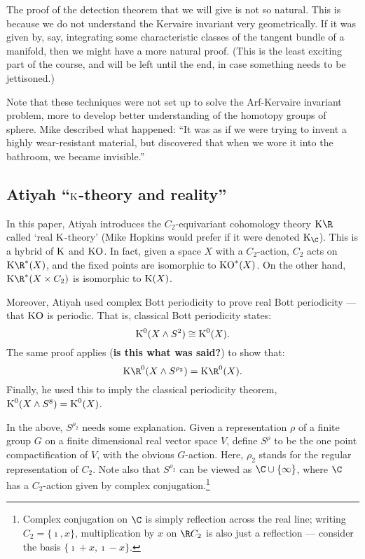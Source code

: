 \documentclass[11pt]{article}
\begin{document}
The proof of the detection theorem that we will give is not so natural. This is
because we do not understand the Kervaire invariant very geometrically. If it
was given by, say, integrating some characteristic classes of the tangent bundle
of a manifold, then we might have a more natural proof. {\small(This is the
least exciting part of the course, and will be left until the end, in case
something needs to be jettisoned.)}

Note that these techniques were not set up to solve the Arf-Kervaire invariant
problem, more to develop better understanding of the homotopy groups of sphere.
Mike described what happened: ``It was as if we were trying to invent a highly
wear-resistant material, but discovered that when we wore it into the bathroom,
we became invisible.''

\subsection*{Atiyah ``\texorpdfstring{$\operatorname{{K}}$}{K}-theory and reality''}
In this paper, Atiyah introduces the $C_2$-equivariant cohomology theory $\KR$
called `real $\operatorname{{K}}$-theory' (Mike Hopkins would prefer if it were denoted
${\K_\C}$). This is a hybrid of $\operatorname{{K}}$ and $\operatorname{{KO}}$. In fact, given a space $X$ with
a $C_2$-action, $C_2$ acts on $\KR^*(X)$, and the fixed points are isomorphic to
$\operatorname{{KO}}^*(X)$. On the other hand, $\KR^*(X\times C_2)$ is isomorphic to $\operatorname{{K}}(X)$.

Moreover, Atiyah used complex Bott periodicity to prove real Bott periodicity
--- that $\operatorname{{KO}}$ is periodic. That is, classical Bott periodicity states:
\[\operatorname{{K}}^0(X\wedge S^2)\cong \operatorname{{K}}^0(X).\]
The same proof applies (\textbf{is this what was said?}) to show that:
\[\KR^0(X\wedge S^{\rho_2})=\KR^0(X).\]
Finally, he used this to imply the classical periodicity theorem, $\operatorname{{K}}^0(X\wedge
S^8)=\operatorname{{K}}^0(X)$.

In the above, $S^{\rho_2}$ needs some explanation. Given a representation $\rho$
of a finite group $G$ on a finite dimensional real vector space $V$, define
$S^{\rho}$ to be the one point compactification of $V$, with the obvious
$G$-action. Here, $\rho_2$ stands for the regular representation of $C_2$.
Note also that $S^{\rho_2}$ can be viewed as $\C\cup\{\infty\}$, where $\C$ has
a $C_2$-action given by complex conjugation.\footnote{Complex conjugation on
$\C$ is simply reflection across the real line; writing $C_2=\{\imath,x\}$,
multiplication by $x$ on $\R C_2$ is also just a reflection --- consider the
basis $\{\imath+x,\imath-x\}$.}
\end{document}
